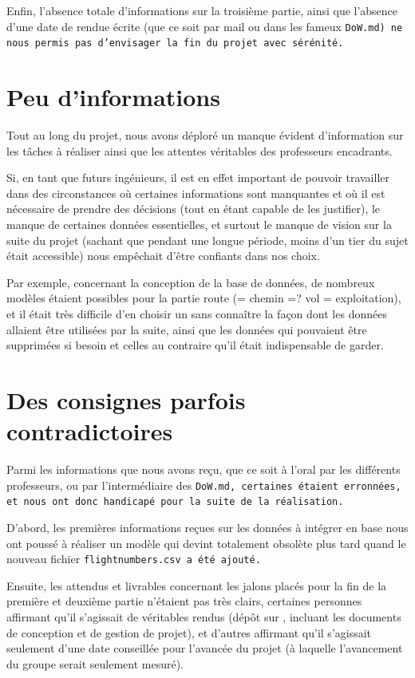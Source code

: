 \documentclass[a4paper, 11pt, twoside]{book}
\begin{document}
Enfin, l'absence totale d'informations sur la troisième partie, ainsi que l'absence d'une date de rendue écrite (que ce soit par mail ou dans les fameux \tt{DoW.md}) ne nous permis pas d'envisager la fin du projet avec sérénité.

\section{Peu d'informations}

Tout au long du projet, nous avons déploré un manque évident d'information sur les tâches à réaliser ainsi que les attentes véritables des professeurs encadrants.

Si, en tant que futurs ingénieurs, il est en effet important de pouvoir travailler dans des circonstances où certaines informations sont manquantes et où il est nécessaire de prendre des décisions (tout en étant capable de les justifier), le manque de certaines données essentielles, et surtout le manque de vision sur la suite du projet (sachant que pendant une longue période, moins d'un tier du sujet était accessible) nous empêchait d'être confiants dans nos choix.

Par exemple, concernant la conception de la base de données, de nombreux modèles étaient possibles pour la partie route (= chemin =? vol = exploitation), et il était très difficile d'en choisir un sans connaître la façon dont les données allaient être utilisées par la suite, ainsi que les données qui pouvaient être supprimées si besoin et celles au contraire qu'il était indispensable de garder.

\section{Des consignes parfois contradictoires}

Parmi les informations que nous avons reçu, que ce soit à l'oral par les différents professeurs, ou par l'intermédiaire des \tt{DoW.md}, certaines étaient erronnées, et nous ont donc handicapé pour la suite de la réalisation.

D'abord, les premières informations reçues sur les données à intégrer en base nous ont poussé à réaliser un modèle qui devint totalement obsolète plus tard quand le nouveau fichier \tt{flightnumbers.csv} a été ajouté.

Ensuite, les attendus et livrables concernant les jalons placés pour la fin de la première et deuxième partie n'étaient pas très clairs, certaines personnes affirmant qu'il s'agissait de véritables rendus (dépôt sur , incluant les documents de conception et de gestion de projet), et d'autres affirmant qu'il s'agissait seulement d'une date conseillée pour l'avancée du projet (à laquelle l'avancement du groupe serait seulement mesuré).
\end{document}
